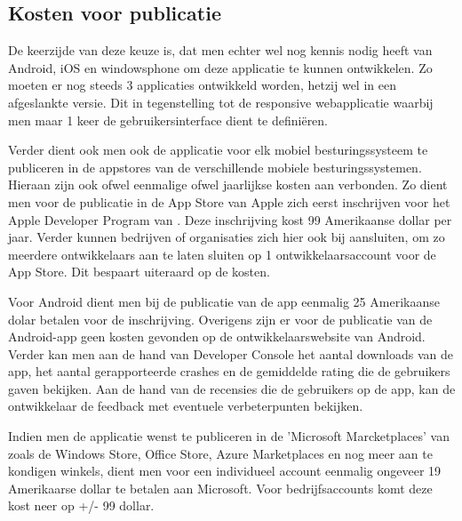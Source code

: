 \subsection{Kosten voor publicatie}
De keerzijde van deze keuze is, dat men echter wel nog kennis nodig heeft van Android, iOS en windowsphone om deze applicatie te
kunnen ontwikkelen. Zo moeten er nog steeds 3 applicaties ontwikkeld worden, hetzij wel in een afgeslankte versie.
Dit in tegenstelling tot de responsive webapplicatie waarbij men maar 1 keer de gebruikersinterface dient te definiëren.

Verder dient ook men ook de applicatie voor elk mobiel besturingssysteem te publiceren in de appstores van de verschillende
mobiele besturingssystemen. Hieraan zijn ook ofwel eenmalige ofwel jaarlijkse kosten aan verbonden. Zo dient men voor de publicatie in de App Store van Apple zich eerst inschrijven voor het
Apple Developer Program van \cite{appledeveloperprograms2017} . Deze inschrijving kost 99 Amerikaanse dollar per jaar. Verder kunnen bedrijven of organisaties
zich hier ook bij aansluiten, om zo meerdere ontwikkelaars aan te laten sluiten op 1 ontwikkelaarsaccount voor de App Store.
Dit bespaart uiteraard op de kosten.

Voor Android dient men bij de publicatie van de app \cite{getstartedwithpublishingandroiddevelopers2017} eenmalig 25 Amerikaanse dolar betalen voor de inschrijving.
Overigens zijn er voor de publicatie van de Android-app geen kosten gevonden op de ontwikkelaarswebsite van Android.
Verder kan men aan de hand van Developer Console het aantal downloads van de app, het aantal gerapporteerde crashes en de gemiddelde rating die de gebruikers gaven bekijken.
Aan de hand van de recensies die de gebruikers op de app, kan de ontwikkelaar de feedback met eventuele verbeterpunten bekijken.

Indien men de applicatie wenst te publiceren in de 'Microsoft Marcketplaces' van \cite{registerasanappdeveloper2017}
 zoals de Windows Store, Office Store, Azure Marketplaces en nog meer aan te kondigen winkels, dient men voor een individueel account
 eenmalig ongeveer 19 Amerikaarse dollar te betalen aan Microsoft. Voor bedrijfsaccounts komt deze kost neer op +/- 99 dollar.
